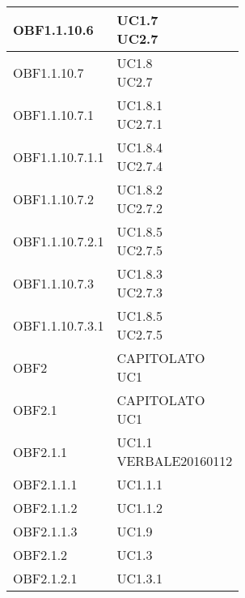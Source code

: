 \documentclass{scalatekids-article}
\begin{document}
\begin{longtable}[H]{|p{5.5cm}|p{5.5cm}|}
  \hline
  OBF1.1.10.6 & \multiLineCell[t]{UC1.7\\UC2.7\\}\\
  \hline
  OBF1.1.10.7 & \multiLineCell[t]{UC1.8\\UC2.7\\}\\
  \hline
  OBF1.1.10.7.1 & \multiLineCell[t]{UC1.8.1\\UC2.7.1\\}\\
  \hline
  OBF1.1.10.7.1.1 & \multiLineCell[t]{UC1.8.4\\UC2.7.4\\}\\
  \hline
  OBF1.1.10.7.2 & \multiLineCell[t]{UC1.8.2\\UC2.7.2\\}\\
  \hline
  OBF1.1.10.7.2.1 & \multiLineCell[t]{UC1.8.5\\UC2.7.5\\}\\
  \hline
  OBF1.1.10.7.3 & \multiLineCell[t]{UC1.8.3\\UC2.7.3\\}\\
  \hline
  OBF1.1.10.7.3.1 & \multiLineCell[t]{UC1.8.5\\UC2.7.5\\}\\
  \hline
  OBF2 & \multiLineCell[t]{CAPITOLATO\\UC1\\}\\
  \hline
  OBF2.1 & \multiLineCell[t]{CAPITOLATO\\UC1\\}\\
  \hline
  OBF2.1.1 & \multiLineCell[t]{UC1.1\\VERBALE20160112\\}\\
  \hline
  OBF2.1.1.1 & \multiLineCell[t]{UC1.1.1\\}\\
  \hline
  OBF2.1.1.2 & \multiLineCell[t]{UC1.1.2\\}\\
  \hline
  OBF2.1.1.3 & \multiLineCell[t]{UC1.9\\}\\
  \hline
  OBF2.1.2 & \multiLineCell[t]{UC1.3\\}\\
  \hline
  OBF2.1.2.1 & \multiLineCell[t]{UC1.3.1\\}\\

\end{longtable}
\end{document}
